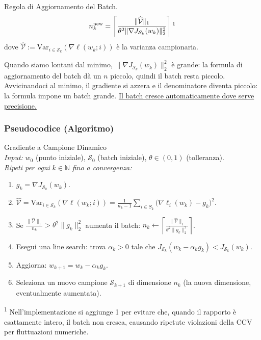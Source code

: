 \documentclass[a4paper,12pt]{article}
\newcommand{\Var}{\mathrm{Var}}
\begin{document}
\begin{definitionbox}
  Regola di Aggiornamento del Batch.
  \[
    n_{k}^{\mathrm{new}} = \left\lceil \frac{\|\widehat{\mathcal{V}}\|_1}{\theta^2 \|\nabla J_{\mathcal{S}_k}(w_k)\|_2^2} \right\rceil\textsuperscript{1}
  \]
  dove $\widehat{\mathcal{V}} := \Var_{i \in \mathcal{S}_k}(\nabla \ell(w_k;i))$ \`e la varianza campionaria.
  
\end{definitionbox}

\begin{notebox}
  Quando siamo lontani dal minimo, $\|\nabla J_{\mathcal{S}_k}(w_k)\|_2^2$ \`e grande: la formula di aggiornamento del batch d\`a un $n$ piccolo, quindi il batch resta piccolo. Avvicinandoci al minimo, il gradiente si azzera e il denominatore diventa piccolo: la formula impone un batch grande. \underline{Il batch cresce automaticamente dove serve precisione.}
\end{notebox}

\subsubsection{Pseudocodice (Algoritmo)}

\begin{actionbox}
  Gradiente a Campione Dinamico\\[0.3cm]
  \textit{Input:} $w_0$ (punto iniziale), $\mathcal{S}_0$ (batch iniziale), $\theta \in (0,1)$ (tolleranza).\\[0.1cm]
  \textit{Ripeti per ogni } $k \in \mathbb{N}$ \textit{ fino a convergenza:}
  \begin{enumerate}
    \item $g_k = \nabla J_{\mathcal{S}_k}(w_k)$.
    \item $\widehat{\mathcal{V}} = \Var_{i \in \mathcal{S}_k}(\nabla \ell(w_k;i)) = \frac{1}{n_k - 1} \sum_{i \in S_k} \bigl(\nabla \ell_i(w_k) - g_k\bigr)^2
$.
    \item Se $\frac{\|\widehat{\mathcal{V}}\|_1}{n_k} > \theta^2 \|g_k\|_2^2$ aumenta il batch: $n_k \leftarrow \left\lceil \frac{\|\widehat{\mathcal{V}}\|_1}{\theta^2 \|g_k\|_2^2} \right\rceil$.
    \item Esegui una line search: trova $\alpha_k > 0$ tale che $J_{\mathcal{S}_k}(w_k - \alpha_k g_k) < J_{\mathcal{S}_k}(w_k)$.
    \item Aggiorna: $w_{k+1} = w_k - \alpha_k g_k$.
    \item Seleziona un nuovo campione $\mathcal{S}_{k+1}$ di dimensione $n_k$ (la nuova dimensione, eventualmente aumentata).
  \end{enumerate}
\end{actionbox}
\noindent \textsuperscript{1} Nell'implementazione si aggiunge 1 per evitare che, quando il rapporto è esattamente intero, il batch non cresca, causando ripetute violazioni della CCV per fluttuazioni numeriche.
\newpage
\end{document}
